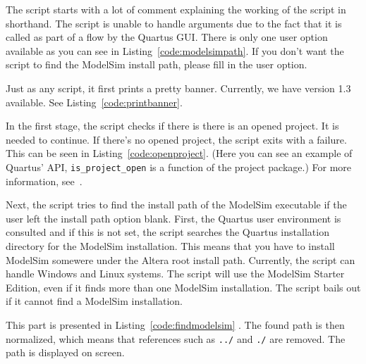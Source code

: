 \documentclass[11pt,a4paper,final,oneside,titlepage,fleqn]{article}
\begin{document}
The script starts with a lot of comment explaining the working of the script
in shorthand. The script is unable to handle arguments due to the fact that it
is called as part of a flow by the Quartus GUI. There is only one user option
available as you can see in Listing~\ref{code:modelsimpath}. If you don't want
the script to find the ModelSim install path, please fill in the user option.



Just as any script, it first prints a pretty banner. Currently, we have
version 1.3 available. See Listing~\ref{code:printbanner}.



In the first stage, the script checks if there is there is an opened project.
It is needed to continue. If there's no opened project, the script exits with
a failure. This can be seen in Listing~\ref{code:openproject}. (Here you can
see an example of Quartus' API, \texttt{is\_project\_open} is a function of the
project package.) For more information, see~\cite{web/pkg_quartus_project}.



Next, the script tries to find the install path of the ModelSim executable if
the user left the install path option blank. First, the Quartus user
environment is consulted and if this is not set, the script searches the
Quartus installation directory for the ModelSim installation. This means
that you have to install ModelSim somewere under the Altera root install path.
Currently, the script can handle Windows and Linux systems. The script will
use the ModelSim Starter Edition, even if it finds more than one ModelSim
installation. The script bails out if it cannot find a ModelSim installation.

This
part is presented in Listing~\ref{code:findmodelsim}%
. The found path is then normalized, which means
that references such as \texttt{../} and
\texttt{./} are removed. The path is displayed on screen. \\
\end{document}
